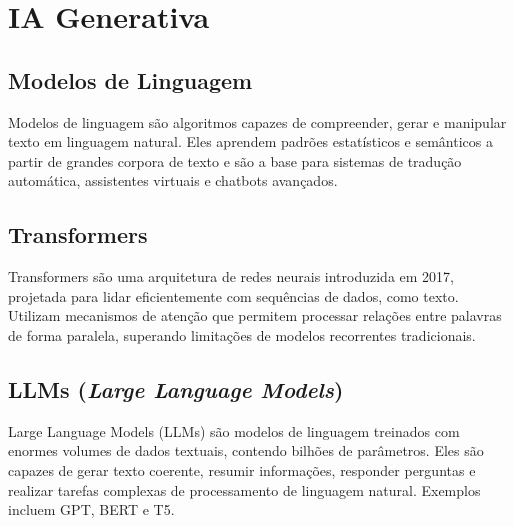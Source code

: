 \section{IA Generativa}
\subsection{Modelos de Linguagem}

Modelos de linguagem são algoritmos capazes de compreender, gerar e manipular texto em linguagem natural. Eles aprendem padrões estatísticos e semânticos a partir de grandes corpora de texto e são a base para sistemas de tradução automática, assistentes virtuais e chatbots avançados.

\subsection{Transformers}

Transformers são uma arquitetura de redes neurais introduzida em 2017, projetada para lidar eficientemente com sequências de dados, como texto. Utilizam mecanismos de atenção que permitem processar relações entre palavras de forma paralela, superando limitações de modelos recorrentes tradicionais.

\subsection{LLMs (\emph{Large Language Models})}

Large Language Models (LLMs) são modelos de linguagem treinados com enormes volumes de dados textuais, contendo bilhões de parâmetros. Eles são capazes de gerar texto coerente, resumir informações, responder perguntas e realizar tarefas complexas de processamento de linguagem natural. Exemplos incluem GPT, BERT e T5.
